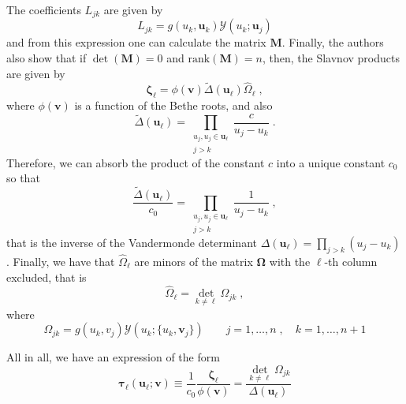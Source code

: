 \documentclass[a4paper,11pt]{amsart}
\begin{document}
The coefficients \(L_{jk}\) are given by 
\begin{equation}
  L_{jk} = g(u_k, \bm{u}_k) \mathcal{Y}(u_k; \bm{u}_j)
\end{equation}
and from this expression one can calculate the matrix \(\bm{M}\).
Finally, the authors also show that if \(\det (\bm{M}) = 0 \) and
\(\mathrm{rank}(\bm{M}) = n\), then, the Slavnov products are given by
\begin{equation}
 \bm{\zeta}_\ell = \phi(\bm{v}) \tilde{\Delta}(\bm{u}_\ell)\hat{\Omega}_\ell\; ,
\end{equation}
where \(\phi(\bm{v})\) is a function of the Bethe roots, and also
\begin{equation}
  \tilde{\Delta}(\bm{u}_\ell) = \prod_{\substack{u_j, u_j \in \bm{u}_\ell \\ j>k}} \frac{c}{u_j - u_k}\; . 
\end{equation}
Therefore, we can absorb the product of the constant \(c\) into
a unique constant \(c_0\) so that 
\begin{equation}
  \frac{\tilde{\Delta}(\bm{u}_\ell)}{c_0} = \prod_{\substack{u_j, u_j \in \bm{u}_\ell \\ j>k}} \frac{1}{u_j - u_k}\; , 
\end{equation}
that is the inverse of the Vandermonde determinant
\(\Delta(\bm{u}_\ell) = \prod_{j>k}(u_j - u_k)\).
Finally, we have  that \(\hat{\Omega}_\ell\) are minors of the matrix \(\bm{\Omega}\) with the \(\ell\)-th
column excluded, that is 
\begin{equation}
 \hat{\Omega}_\ell = \det_{k\neq \ell} \Omega_{jk}\; ,
\end{equation}
where
\begin{equation}
  \Omega_{jk} = g(u_k, v_j) \mathcal{Y}(u_k; \{u_k, \bm{v}_j\})
  \qquad j= 1, \dots, n\; , \quad k =1, \dots, n+1
\end{equation}

All in all, we have an expression of the
form
\begin{equation}
  \bm{\tau}_\ell(\bm{u}_\ell; \bm{v}) \equiv \frac{1}{c_0}\frac{\bm{\zeta}_\ell}{\phi(\bm{v})}
  = \frac{\det_{k\neq \ell} \Omega_{jk}}{\Delta(\bm{u}_\ell)}
\end{equation}
\end{document}
